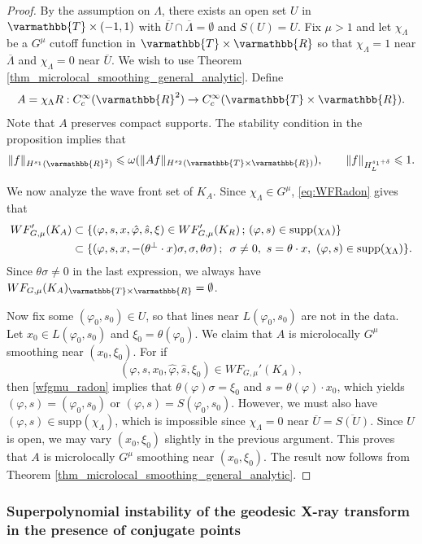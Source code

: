 \documentclass[12pt,twoside]{amsart}
\numberwithin{equation}{section}
\renewcommand{\leq}{\leqslant}
\renewcommand{\mathbb}{\varmathbb}
\newcommand {\T} {\mathbb{T}} \newcommand {\N} {\mathbb{N}}
\newcommand{\mR}{\mathbb{R}}                    %
\newcommand{\norm}[1]{\lVert #1 \rVert}         %
\newcommand{\ol}[1]{\overline{#1}}
\newcommand{\supp}{\mathrm{supp}}
\begin{document}
\begin{proof}
By the assumption on $\Lambda$, there exists an open set $U$ in $\T \times (-1,1)$ with $\ol{U} \cap \ol{\Lambda} = \emptyset$ and $S(U) = U$. Fix $\mu > 1$ and let $\chi_{\Lambda}$ be a $G^{\mu}$ cutoff function in $\T \times \mR$ so that $\chi_{\Lambda} = 1$ near $\ol{\Lambda}$ and $\chi_{\Lambda} = 0$ near $\ol{U}$. We wish to use Theorem \ref{thm_microlocal_smoothing_general_analytic}. Define 
\[
A = \chi_{\Lambda} R: C^{\infty}_c(\mR^2) \to C^{\infty}_c(\T \times \mR).
\]
Note that $A$ preserves compact supports. The stability condition in the proposition implies that 
\[
\norm{f}_{H^{s_1}(\mR^2)} \leq \omega(\norm{A f}_{H^{s_2}(\T \times \mR)}), \qquad \norm{f}_{H^{s_1+\delta}_L} \leq 1.
\]

We now analyze the wave front set of $K_A$. Since $\chi_{\Lambda} \in G^{\mu}$, \eqref{eq:WFRadon} gives that 
\begin{align}
WF_{G,\mu}'(K_A) &\subset \{ (\varphi,s,x,\hat{\varphi},\hat{s},\xi) \in WF_{G,\mu}'(K_R) \,;\, (\varphi,s) \in \supp(\chi_{\Lambda}) \} \notag \\
 &\subset  \{(\varphi, s, x,-(\theta^{\perp}\cdot x) \sigma, \sigma, \theta \sigma ) \,;\, \ \sigma\neq 0, \ s = \theta\cdot x, \ (\varphi, s) \in \supp(\chi_{\Lambda}) \}. \label{wfgmu_radon}
\end{align}
Since $\theta \sigma \neq 0$ in the last expression, we always have $WF_{G,\mu}(K_A)_{\T \times \mR} = \emptyset$.

 Now fix some $(\varphi_0, s_0) \in U$, so that lines near $L(\varphi_0, s_0)$ are not in the data. Let $x_0 \in L(\varphi_0, s_0)$ and $\xi_0 = \theta(\varphi_0)$. We claim that $A$ is microlocally $G^{\mu}$ smoothing near $(x_0, \xi_0)$. For if 
 \[
 (\varphi,s,x_0,\hat{\varphi}, \hat{s}, \xi_0) \in WF_{G,\mu}'(K_A),
 \]
 then \eqref{wfgmu_radon} implies that $\theta(\varphi) \sigma = \xi_0$ and $s = \theta(\varphi) \cdot x_0$, which yields $(\varphi,s) = (\varphi_0, s_0)$ or $(\varphi,s) = S(\varphi_0, s_0)$. However, we must also have $(\varphi, s) \in \supp(\chi_{\Lambda})$, which is impossible since $\chi_{\Lambda} = 0$ near $\ol{U} = \ol{S(U)}$. Since $U$ is open, we may vary $(x_0,\xi_0)$ slightly in the previous argument. This proves that $A$ is microlocally $G^{\mu}$ smoothing near $(x_0, \xi_0)$. The result now follows from Theorem \ref{thm_microlocal_smoothing_general_analytic}.
\end{proof}




\subsubsection{Superpolynomial instability of the geodesic X-ray transform in the presence of conjugate points}
\label{sec:Xray}
\end{document}

